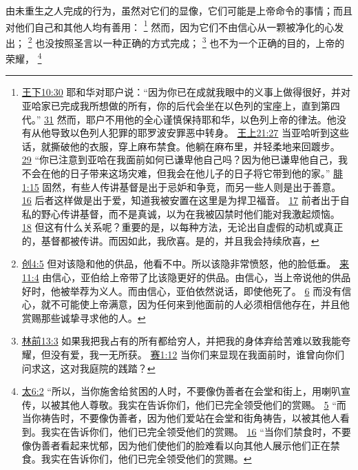\documentclass[12pt, a4paper, oneside]{ctexart}
\newcounter{parnum}[section]
\newcommand{\N}{%
   \noindent\refstepcounter{parnum}%
    \makebox[\parindent][l]{\textbf{\arabic{parnum}.}}}
\begin{document}
\N 由未重生之人完成的行为，虽然对它们的显像，它们可能是上帝命令的事情；而且对他们自己和其他人均有善用：
	\footnote {
		\href{https://biblehub.com/2_kings/10-30.htm}{王下10:30} 耶和华对耶户说：“因为你已在成就我眼中的义事上做得很好，并对亚哈家已完成我所想做的所有，你的后代会坐在以色列的宝座上，直到第四代。”
		\href{https://biblehub.com/2_kings/10-31.htm}{31} 然而，耶户不用他的全心谨慎保持耶和华，以色列上帝的律法。他没有从他导致以色列人犯罪的耶罗波安罪恶中转身。
		\href{https://biblehub.com/1_kings/21-27.htm}{王上21:27} 当亚哈听到这些话，就撕破他的衣服，穿上麻布禁食。他躺在麻布里，并轻柔地来回踱步。
		\href{https://biblehub.com/1_kings/21-29.htm}{29} “你已注意到亚哈在我面前如何已谦卑他自己吗？因为他已谦卑他自己，我不会在他的日子带来这场灾难，但我会在他儿子的日子将它带到他的家。”
		\href{https://biblehub.com/philippians/1-15.htm}{腓1:15} 固然，有些人传讲基督是出于忌妒和争竞，而另一些人则是出于善意。
		\href{https://biblehub.com/philippians/1-16.htm}{16} 后者这样做是出于爱，知道我被安置在这里是为捍卫福音。
		\href{https://biblehub.com/philippians/1-17.htm}{17} 前者出于自私的野心传讲基督，而不是真诚，以为在我被囚禁时他们能对我激起烦恼。
		\href{https://biblehub.com/philippians/1-18.htm}{18} 但这有什么关系呢？重要的是，以每种方法，无论出自虚假的动机或真正的，基督都被传讲。而因如此，我欣喜。是的，并且我会持续欣喜，
	}
	然而，因为它们不由信心从一颗被净化的心发出；
	\footnote {
		\href{https://biblehub.com/genesis/4-5.htm}{创4:5} 但对该隐和他的供品，他看不中。所以该隐非常愤怒，他的脸低垂。
		\href{https://biblehub.com/hebrews/11-4.htm}{来11:4} 由信心，亚伯给上帝带了比该隐更好的供品。由信心，当上帝说他的供品好时，他被举荐为义人。而由信心，亚伯依然说话，即使他死了。
		\href{https://biblehub.com/hebrews/11-6.htm}{6} 而没有信心，就不可能使上帝满意，因为任何来到他面前的人必须相信他存在，并且他赏赐那些诚挚寻求他的人。
	}
	也没按照圣言以一种正确的方式完成；
	\footnote {
		\href{https://biblehub.com/1_corinthians/13-3.htm}{林前13:3} 如果我把我占有的所有都给穷人，并把我的身体弃给苦难以致我能夸耀，但没有爱，我一无所获。
		\href{https://biblehub.com/isaiah/1-12.htm}{赛1:12} 当你们来显现在我面前时，谁曾向你们问求这，这对我庭院的践踏？
	}
	也不为一个正确的目的，上帝的荣耀，
	\footnote {
		\href{https://biblehub.com/matthew/6-2.htm}{太6:2} “所以，当你施舍给贫困的人时，不要像伪善者在会堂和街上，用喇叭宣传，以被其他人尊敬。我实在告诉你们，他们已完全领受他们的赏赐。
		\href{https://biblehub.com/matthew/6-5.htm}{5} “而当你祷告时，不要像伪善者，因为他们爱站在会堂和街角祷告，以被其他人看到。我实在告诉你们，他们已完全领受他们的赏赐。
		\href{https://biblehub.com/matthew/6-16.htm}{16} “当你们禁食时，不要像伪善者看起来忧郁，因为他们使他们的脸难看以向其他人展示他们正在禁食。我实在告诉你们，他们已完全领受他们的赏赐。
	}
\end{document}
